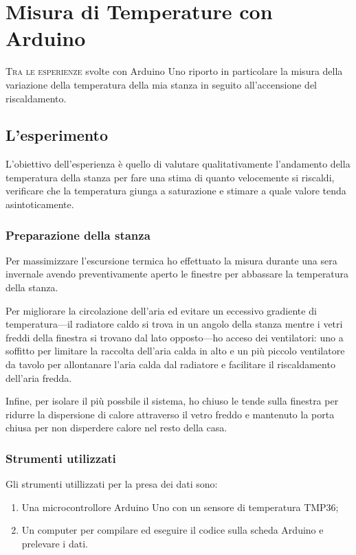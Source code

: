 \newcommand{\tmp}{TMP36}
\newcommand{\vs}{\texttt{+vs}}
\newcommand{\vout}{\texttt{vout}}
\newcommand{\gnd}{\texttt{gnd}}
\newcommand{\pinV}{\texttt{5v}}
\newcommand{\sensorpin}{\texttt{A0}}
\newcommand{\txtloop}{\texttt{loop}}

\chapter{Misura di Temperature con Arduino}\label{ch:ard}
    \lettrine[loversize=0.08, lines=2]{T}{ra le esperienze} svolte con Arduino Uno riporto in particolare la misura della variazione della temperatura della mia stanza in seguito all'accensione del riscaldamento.

    \section{L'esperimento}
            L'obiettivo dell'esperienza è quello di valutare qualitativamente l'andamento della temperatura della stanza per fare una stima di quanto velocemente si riscaldi, verificare che la temperatura giunga a saturazione e stimare a quale valore tenda asintoticamente.

        \subsection{Preparazione della stanza}\label{ss:ard:preparazione}
            Per massimizzare l'escursione termica ho effettuato la misura durante una sera invernale avendo preventivamente aperto le finestre per abbassare la temperatura della stanza.
            
            Per migliorare la circolazione dell'aria ed evitare un eccessivo gradiente di temperatura---il radiatore caldo si trova in un angolo della stanza mentre i vetri freddi della finestra si trovano dal lato opposto---ho acceso dei ventilatori: uno a soffitto per limitare la raccolta dell'aria calda in alto e un più piccolo ventilatore da tavolo per allontanare l'aria calda dal radiatore e facilitare il riscaldamento dell'aria fredda.
            
            Infine, per isolare il più possbile il sistema, ho chiuso le tende sulla finestra per ridurre la dispersione di calore attraverso il vetro freddo e mantenuto la porta chiusa per non disperdere calore nel resto della casa.

        \subsection{Strumenti utilizzati}
            Gli strumenti utillizzati per la presa dei dati sono:
            \begin{enumerate}[label=$\bullet$]
                \item Una microcontrollore Arduino Uno con un sensore di temperatura \tmp;
                \item Un computer per compilare ed eseguire il codice sulla scheda Arduino e prelevare i dati.
            \end{enumerate}


